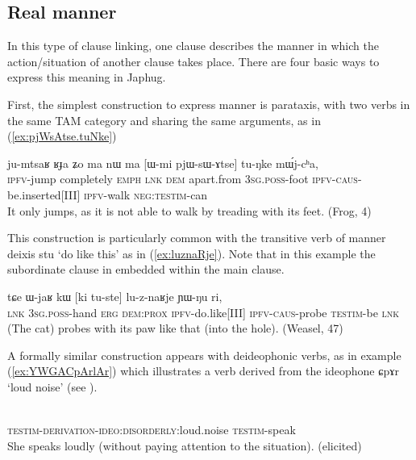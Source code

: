 \documentclass[oldfontcommands,oneside,a4paper,11pt]{article}
\newcommand{\ipa}[1]{{\phon \mbox{#1}}} %
\newcommand{\refb}[1]{(\ref{#1})}
\begin{document}
\subsection{Real manner}
In this type of clause linking, one clause describes the manner in which the action/situation of another clause takes place. There are four basic ways to express this meaning in Japhug.

First, the simplest construction to express manner is  parataxis, with    two verbs  in the same TAM category and sharing the same arguments, as in \refb{ex:pjWsAtse.tuNke}

\begin{exe}
\ex \label{ex:pjWsAtse.tuNke}
\gll
\ipa{ju-mtsaʁ} 	\ipa{ʁɟa} 	\ipa{ʑo} 	\ipa{ma} 	\ipa{nɯ} 	\ipa{ma} 	[\ipa{ɯ-mi} 	\ipa{pjɯ-sɯ-ɤtse}] 	\ipa{tu-ŋke} 	\ipa{mɯ́j-cʰa,} \\
\textsc{ipfv}-jump completely \textsc{emph} \textsc{lnk} \textsc{dem} apart.from \textsc{3sg.poss}-foot \textsc{ipfv-caus}-be.inserted[III] \textsc{ipfv}-walk \textsc{neg:testim}-can \\
\glt It only jumps, as it is not able to walk by treading with its feet.  (Frog, 4)
\end{exe}

This construction is particularly common with the transitive verb of manner deixis \ipa{stu} `do like this' as in \refb{ex:luznaRje}. Note that in this example the subordinate clause in embedded within the main clause.

\begin{exe}
\ex \label{ex:luznaRje}
\gll
\ipa{tɕe} 	\ipa{ɯ-jaʁ} 	\ipa{kɯ} 	[\ipa{ki} 	\ipa{tu-ste}] 	\ipa{lu-z-naʁje} 	\ipa{ɲɯ-ŋu} 	\ipa{ri,} \\
\textsc{lnk} \textsc{3sg.poss}-hand \textsc{erg} \textsc{dem:prox} \textsc{ipfv}-do.like[III] \textsc{ipfv-caus}-probe \textsc{testim}-be \textsc{lnk} \\
\glt (The cat) probes with its paw like that (into the hole). (Weasel, 47)
\end{exe}
A formally similar construction appears with deideophonic verbs, as in example \refb{ex:YWGACpArlAr} which illustrates a   verb derived from the ideophone \ipa{ɕpɤr} `loud noise' (see \citealt{japhug14ideophones}).

\begin{exe}
\ex \label{ex:YWGACpArlAr}
\gll
[\ipa{ɲɯ-ɣɤ-ɕpɤrlɤr}] 	\ipa{ɲɯ-rɯɕmi} \\
\textsc{testim-derivation-ideo:disorderly:}loud.noise \textsc{testim}-speak\\
\glt She speaks loudly (without paying attention to the situation). (elicited)
\end{exe}
\end{document}
